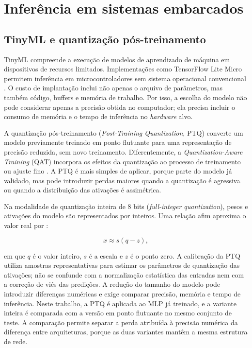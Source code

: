 \section{Inferência em sistemas embarcados}
\label{sec:ft-embarcado}

\subsection{TinyML e quantização pós-treinamento}
\label{subsec:ft-tinyml}

TinyML compreende a execução de modelos de aprendizado de máquina em
dispositivos de recursos limitados. Implementações como TensorFlow Lite
Micro permitem inferência em microcontroladores sem sistema operacional
convencional \cite{david2021}. O custo de implantação inclui não apenas
o arquivo de parâmetros, mas também código, buffers e memória de
trabalho. Por isso, a escolha do modelo não pode considerar apenas a
precisão obtida no computador; ela precisa incluir o consumo de memória
e o tempo de inferência no \textit{hardware} alvo.

A quantização pós-treinamento (\textit{Post-Training Quantization}, PTQ)
converte um modelo previamente treinado em ponto flutuante para uma
representação de precisão reduzida, sem novo treinamento. Diferentemente,
a \textit{Quantization-Aware Training} (QAT) incorpora os efeitos da
quantização ao processo de treinamento ou ajuste fino
\cite{krishnamoorthi2018quantization,nagel2021quantization}. A PTQ é
mais simples de aplicar, porque parte do modelo já validado, mas pode
introduzir perdas maiores quando a quantização é agressiva ou quando a
distribuição das ativações é assimétrica.

Na modalidade de quantização inteira de 8 bits (\textit{full-integer
quantization}), pesos e ativações do modelo são representados por
inteiros. Uma relação afim aproxima o valor real por \cite{jacob2018}:

\begin{equation}
\label{eq:ft-quantizacao}
x\approx s(q-z),
\end{equation}

\noindent em que $q$ é o valor inteiro, $s$ é a escala e $z$ é o ponto
zero. A calibração da PTQ utiliza amostras representativas para estimar
os parâmetros de quantização das ativações; não se confunde com a
normalização estatística das entradas nem com a correção de viés das
predições. A redução do tamanho do modelo pode introduzir diferenças
numéricas e exige comparar precisão, memória e tempo de inferência. Neste trabalho, a PTQ é aplicada ao MLP já
treinado, e a variante inteira é comparada com a versão em ponto
flutuante no mesmo conjunto de teste. A comparação permite separar a
perda atribuída à precisão numérica da diferença entre arquiteturas,
porque as duas variantes mantêm a mesma estrutura de rede.

